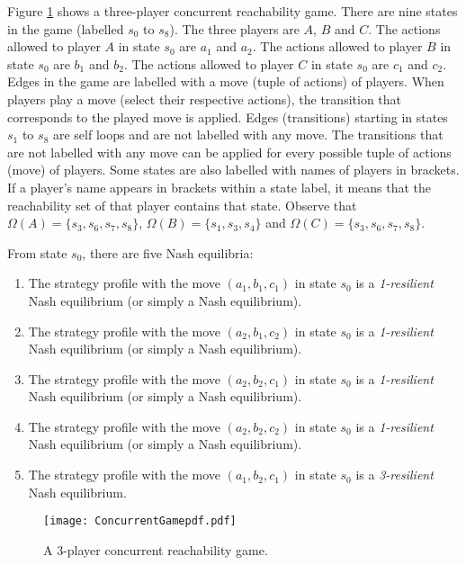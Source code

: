\begin{example}
Figure \ref{fig:concurrentgame} shows a three-player concurrent reachability game. There are nine states in the game (labelled $s_{0}$ to $s_{8}$). The three players are $A$, $B$ and $C$. The actions allowed to player $A$ in state $s_{0}$ are $a_{1}$ and $a_{2}$. The actions allowed to player $B$ in state $s_{0}$ are $b_{1}$ and $b_{2}$. The actions allowed to player $C$ in state $s_{0}$ are $c_{1}$ and $c_{2}$. Edges in the game are labelled with a move (tuple of actions) of players. When players play a move (select their respective actions), the transition that corresponds to the played move is applied. Edges (transitions) starting in states $s_{1}$ to $s_{8}$ are self loops and are not labelled with any move. The transitions that are not labelled with any move can be applied for every possible tuple of actions (move) of players. Some states are also labelled with names of players in brackets. If a player's name appears in brackets within a state label, it means that the reachability set of that player contains that state. Observe that $\Omega (A) = \lbrace s_{3}, s_{6}, s_{7}, s_{8} \rbrace$, $\Omega (B) = \lbrace s_{1}, s_{3}, s_{4} \rbrace$ and $\Omega (C) = \lbrace s_{3}, s_{6}, s_{7}, s_{8} \rbrace$.

From state $s_{0}$, there are five Nash equilibria:
\begin{enumerate}
\item The strategy profile with the move $(a_{1}, b_{1}, c_{1})$ in state $s_{0}$ is a \textit{1-resilient} Nash equilibrium (or simply a Nash equilibrium).
\item The strategy profile with the move $(a_{2}, b_{1}, c_{2})$ in state $s_{0}$ is a \textit{1-resilient} Nash equilibrium (or simply a Nash equilibrium).
\item The strategy profile with the move $(a_{2}, b_{2}, c_{1})$ in state $s_{0}$ is a \textit{1-resilient} Nash equilibrium (or simply a Nash equilibrium).
\item The strategy profile with the move $(a_{2}, b_{2}, c_{2})$ in state $s_{0}$ is a \textit{1-resilient} Nash equilibrium (or simply a Nash equilibrium).
\item The strategy profile with the move $(a_{1}, b_{2}, c_{1})$ in state $s_{0}$ is a \textit{3-resilient} Nash equilibrium.
\end{enumerate}
\end{example}

\begin{figure}[H]
	\centering
	\texttt{[image: ConcurrentGamepdf.pdf]}
	\caption{A 3-player concurrent reachability game.}
	\label{fig:concurrentgame}
\end{figure}


